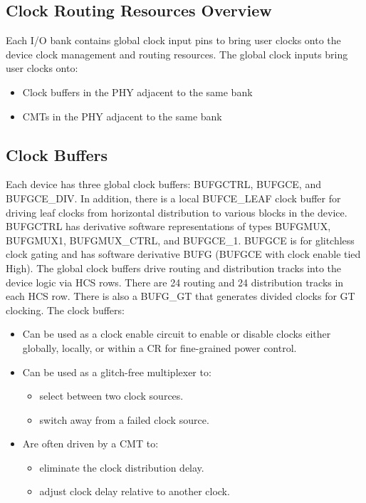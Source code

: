 \documentclass[12pt, a4paper]{report}
\begin{document}
    \subsection{Clock Routing Resources Overview}
    Each I/O bank contains global clock input pins to bring user clocks onto the device clock management and routing resources. The global clock inputs bring user clocks onto:
    \begin{itemize}
        \item Clock buffers in the PHY adjacent to the same bank
        \item CMTs in the PHY adjacent to the same bank
    \end{itemize}

    \subsection{Clock Buffers}
    Each device has three global clock buffers: BUFGCTRL, BUFGCE, and BUFGCE\_DIV. In addition, there is a local BUFCE\_LEAF clock buffer for driving leaf clocks from horizontal distribution to various blocks in the device. BUFGCTRL has derivative software representations of types BUFGMUX, BUFGMUX1, BUFGMUX\_CTRL, and BUFGCE\_1. BUFGCE is for glitchless clock gating and has software derivative BUFG (BUFGCE with clock enable tied High). The global clock buffers drive routing and distribution tracks into the device logic via HCS rows. There are 24 routing and 24 distribution tracks in each HCS row. There
    is also a BUFG\_GT that generates divided clocks for GT clocking. The clock buffers:

    \begin{itemize}
        \item Can be used as a clock enable circuit to enable or disable clocks either globally, locally, or within a CR for fine-grained power control.
        \item Can be used as a glitch-free multiplexer to:
        \begin{itemize}
            \item select between two clock sources.
            \item switch away from a failed clock source.
        \end{itemize}
        \item Are often driven by a CMT to:
        \begin{itemize}
            \item eliminate the clock distribution delay.
            \item adjust clock delay relative to another clock.
        \end{itemize}
    \end{itemize} 
\end{document}
